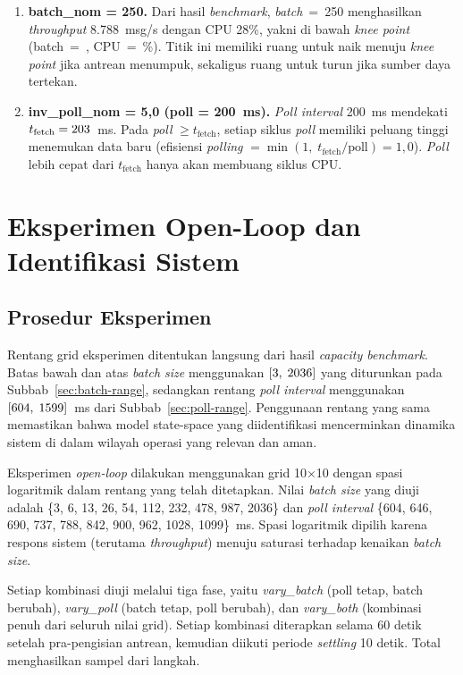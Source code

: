 \begin{enumerate}
\item \textbf{batch\_nom = 250.}
Dari hasil \emph{benchmark}, \emph{batch}~=~250 menghasilkan \emph{throughput} 8.788~msg/s dengan
CPU 28\%, yakni di bawah \emph{knee point} (batch~=~\kneepoint, CPU~=~\kneeCpu\%).
Titik ini memiliki ruang untuk naik menuju \emph{knee point} jika antrean menumpuk,
sekaligus ruang untuk turun jika sumber daya tertekan.

\item \textbf{inv\_poll\_nom = 5{,}0 (poll = 200~ms).}
\emph{Poll interval} 200~ms mendekati $t_{\text{fetch}} = \text{203}$~ms.
Pada \emph{poll} $\geq t_{\text{fetch}}$, setiap siklus \emph{poll} memiliki peluang tinggi menemukan
data baru (efisiensi \emph{polling} $= \min(1,\; t_{\text{fetch}} / \text{poll}) = 1{,}0$).
\emph{Poll} lebih cepat dari $t_{\text{fetch}}$ hanya akan membuang siklus CPU.
\end{enumerate}

\section{Eksperimen Open-Loop dan Identifikasi Sistem}

\subsection{Prosedur Eksperimen}

Rentang grid eksperimen ditentukan langsung dari hasil \emph{capacity benchmark}.
Batas bawah dan atas \emph{batch size} menggunakan $[3,\; 2036]$ yang
diturunkan pada Subbab~\ref{sec:batch-range}, sedangkan rentang \emph{poll interval}
menggunakan $[604,\; 1599]$~ms dari Subbab~\ref{sec:poll-range}.
Penggunaan rentang yang sama memastikan bahwa model state-space yang diidentifikasi mencerminkan
dinamika sistem di dalam wilayah operasi yang relevan dan aman.

Eksperimen \emph{open-loop} dilakukan menggunakan grid 10$\times$10 dengan
spasi logaritmik dalam rentang yang telah ditetapkan.
Nilai \emph{batch size} yang diuji adalah \{3, 6, 13, 26, 54, 112, 232, 478, 987, 2036\} dan
\emph{poll interval} \{604, 646, 690, 737, 788, 842, 900, 962, 1028, 1099\}~ms.
Spasi logaritmik dipilih karena respons sistem (terutama \emph{throughput}) menuju saturasi
terhadap kenaikan \emph{batch size}.

Setiap kombinasi diuji melalui tiga fase, yaitu \emph{vary\_batch} (poll tetap, batch berubah),
\emph{vary\_poll} (batch tetap, poll berubah), dan \emph{vary\_both} (kombinasi penuh dari
seluruh nilai grid).
Setiap kombinasi diterapkan selama 60 detik setelah pra-pengisian antrean,
kemudian diikuti periode \emph{settling} 10 detik.
Total menghasilkan \openloopsamples{} sampel dari \openloopsteps{} langkah.

